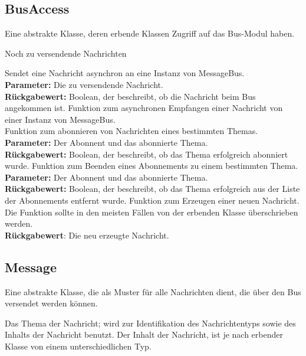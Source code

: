 \documentclass[entwurf.tex]{subfiles}
\begin{document}
	\subsection{BusAccess}
	\label{Class:BusAccess} 
		Eine abstrakte Klasse, deren erbende Klassen Zugriff auf das Bus-Modul haben.
		\begin{description}
				Noch zu versendende Nachrichten
			
				Sendet eine Nachricht asynchron an eine Instanz von MessageBus.\\ 
				\textbf{Parameter:} Die zu versendende Nachricht.\\ 
				\textbf{Rückgabewert:} Boolean, der beschreibt, ob die Nachricht beim Bus angekommen ist.
				Funktion zum asynchronen Empfangen einer Nachricht von einer Instanz von MessageBus.\\ 
				Funktion zum abonnieren von Nachrichten eines bestimmten Themas.\\ 
				\textbf{Parameter:} Der Abonnent und das abonnierte Thema.\\ 
				\textbf{Rückgabewert:} Boolean, der beschreibt, ob das Thema erfolgreich abonniert wurde.
				Funktion zum Beenden eines Abonnements zu einem bestimmten Thema.\\ 
				\textbf{Parameter:} Der Abonnent und das abonnierte Thema.\\ 
				\textbf{Rückgabewert:} Boolean, der beschreibt, ob das Thema erfolgreich aus der Liste der Abonnements entfernt wurde.
				Funktion zum Erzeugen einer neuen Nachricht. Die Funktion sollte in den meisten Fällen von der erbenden Klasse überschrieben werden. \\
				\textbf{Rückgabewert}: Die neu erzeugte Nachricht.
		\end{description}
  		
	\subsection{Message}
	\label{Class:Message} 
		Eine abstrakte Klasse, die als Muster für alle Nachrichten dient, die über den Bus versendet werden können.
		\begin{description}
			\attr{protected topic: Topic}  
				Das Thema der Nachricht; wird zur Identifikation des Nachrichtentyps sowie des Inhalts der Nachricht benutzt.
			\attr{Inhalt}
				Der Inhalt der Nachricht, ist je nach erbender Klasse von einem unterschiedlichen Typ.
		\end{description}
\end{document}
